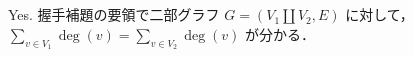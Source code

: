 \subsection{}
Yes. 握手補題の要領で二部グラフ $G = (V_1\amalg V_2, E)$ に対して，$\sum_{v\in V_1}\deg(v) = \sum_{v\in V_2}\deg(v)$ が分かる． 